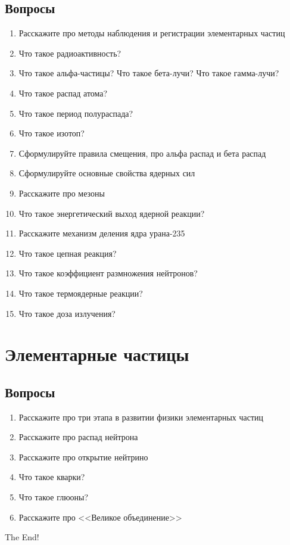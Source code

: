 \documentclass[12pt,a4paper]{report}
\begin{document}
\section{Вопросы}
\begin{enumerate}
\item Расскажите про методы наблюдения и регистрации элементарных частиц
\item Что такое радиоактивность?
\item Что такое альфа-частицы? Что такое бета-лучи? Что такое гамма-лучи?
\item Что такое распад атома?
\item Что такое период полураспада?
\item Что такое изотоп?
\item Сформулируйте правила смещения, про альфа распад и бета распад
\item Сформулируйте основные свойства ядерных сил
\item Расскажите про мезоны
\item Что такое энергетический выход ядерной реакции?
\item Расскажите механизм деления ядра урана-235
\item Что такое цепная реакция?
\item Что такое коэффициент размножения нейтронов?
\item Что такое термоядерные реакции?
\item Что такое доза излучения?
\end{enumerate}

\chapter{Элементарные частицы}
\section{Вопросы}
\begin{enumerate}
\item Расскажите про три этапа в развитии физики элементарных частиц
\item Расскажите про распад нейтрона
\item Расскажите про открытие нейтрино
\item Что такое кварки?
\item Что такое глюоны?
\item Расскажите про <<Великое объединение>>
\end{enumerate}

\newpage

The End!
\end{document}
